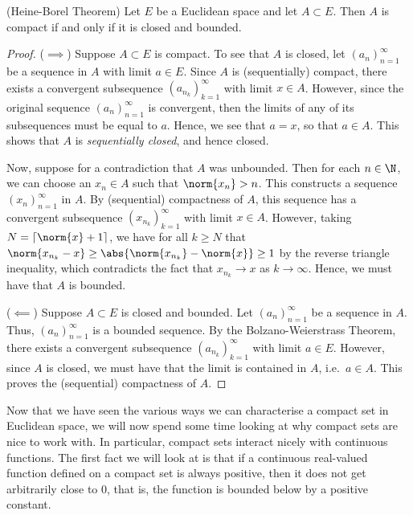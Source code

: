 \begin{theorem}
   (Heine-Borel Theorem) Let \( E \) be a Euclidean space and let \( A\subset E \). Then \( A \) is compact if and only if it is closed and bounded.
 \end{theorem}
 \begin{proof}
   (\( \implies \)) Suppose \( A\subset E \) is compact. To see that \( A \) is closed, let \( (a_n)_{n=1}^\infty \) be a sequence in \( A \) with limit \( a\in E \). Since \( A \) is (sequentially) compact, there exists a convergent subsequence \( (a_{n_k})_{k=1}^\infty \) with limit \( x\in A \). However, since the original sequence \( (a_n)_{n=1}^\infty \) is convergent, then the limits of any of its subsequences must be equal to \( a \). Hence, we see that \( a=x \), so that \( a\in A \). This shows that \( A \) is \emph{sequentially closed}, and hence closed.

   \vspace{3mm}

   Now, suppose for a contradiction that \( A \) was unbounded. Then for each \( n\in\N \), we can choose an \( x_n\in A \) such that \( \norm{x_n}>n \). This constructs a sequence \( (x_n)_{n=1}^\infty \) in \( A \). By (sequential) compactness of \( A \), this sequence has a convergent subsequence \( (x_{n_k})_{k=1}^\infty \) with limit \( x\in A \). However, taking \( N=\lceil\norm{x}+1\rceil \), we have for all \( k\geq N \) that \( \norm{x_{n_k}-x}\geq\abs{\norm{x_{n_k}}-\norm{x}}\geq 1 \) by the reverse triangle inequality, which contradicts the fact that \( x_{n_k}\to x \) as \( k\to\infty \). Hence, we must have that \( A \) is bounded.

   \vspace{3mm}

   (\( \impliedby \)) Suppose \( A\subset E \) is closed and bounded. Let \( (a_n)_{n=1}^\infty \) be a sequence in \( A \). Thus, \( (a_n)_{n=1}^\infty \) is a bounded sequence. By the Bolzano-Weierstrass Theorem, there exists a convergent subsequence \( (a_{n_k})_{k=1}^\infty \) with limit \( a\in E \). However, since \( A \) is closed, we must have that the limit is contained in \( A \), i.e.\ \( a\in A \). This proves the (sequential) compactness of \( A \).
 \end{proof}

 Now that we have seen the various ways we can characterise a compact set in Euclidean space, we will now spend some time looking at why compact sets are nice to work with. In particular, compact sets interact nicely with continuous functions. The first fact we will look at is that if a continuous real-valued function defined on a compact set is always positive, then it does not get arbitrarily close to 0, that is, the function is bounded below by a positive constant.

